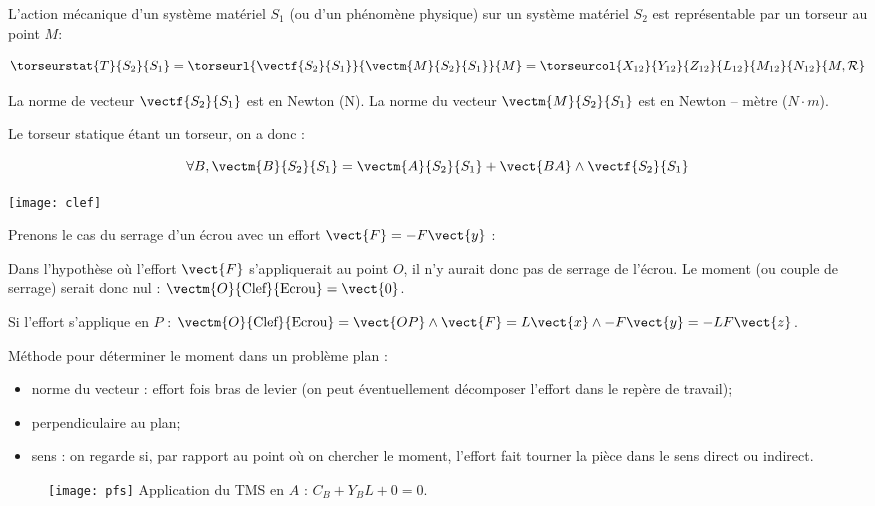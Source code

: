\begin{defi}

L'action mécanique d'un système matériel $S_1$ (ou d'un phénomène physique) sur un système matériel $S_2$ est représentable par un torseur au point $M$:

$$
\torseurstat{T}{S_2}{S_1}
=\torseurl{\vectf{S_2}{S_1}}{\vectm{M}{S_2}{S_1}}{M}
=\torseurcol{X_{12}}{Y_{12}}{Z_{12}}{L_{12}}{M_{12}}{N_{12}}{M,\mathcal{R}}
$$
\end{defi}
\begin{remarque}
La norme de vecteur $\vectf{S_2}{S_1}$ est en Newton (N). La norme du vecteur $\vectm{M}{S_2}{S_1}$ est en Newton -- mètre ($N\cdot m$).
\end{remarque}

\begin{prop}[Varignon]
Le torseur statique étant un torseur, on a donc : 

$$
\forall B, \vectm{B}{S_2}{S_1} = \vectm{A}{S_2}{S_1} + \vect{BA} \wedge \vectf{S_2}{S_1}
$$
\end{prop}



\begin{marginfigure}
\texttt{[image: clef]}
\end{marginfigure}

\begin{remarque}

Prenons le cas du serrage d'un écrou avec un effort $\vect{F}=-F\vect{y}$ :


Dans l'hypothèse où l'effort $\vect{F}$ s'appliquerait au point $O$, il n'y aurait donc pas de serrage de l'écrou. Le moment (ou couple de serrage) serait donc nul : $\vectm{O}{\text{Clef}}{\text{Ecrou}}=\vect{0}$.

Si l'effort s'applique en $P$ :
$\vectm{O}{\text{Clef}}{\text{Ecrou}}=\vect{OP}\wedge\vect{F}
=L\vect{x}\wedge-F\vect{y}=-LF\vect{z}$.

Méthode pour déterminer le moment dans un problème plan : 
\begin{itemize}
\item norme du vecteur : effort fois bras de levier (on peut éventuellement décomposer l'effort dans le repère de travail);
\item perpendiculaire au plan;
\item sens : on regarde si, par rapport au point où on chercher le moment, l'effort fait tourner la pièce dans le sens direct ou indirect. 
\end{itemize}

\end{remarque}

\begin{figure}[!h]
\centering
\texttt{[image: pfs]}
Application du TMS en $A$ : $C_B + Y_B L + 0 = 0$.
\end{figure}

